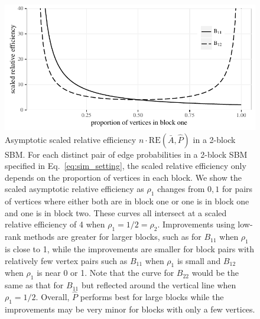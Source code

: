 \begin{figure}
\centering
\includegraphics[width=1\textwidth]{./Figures/rho.pdf}
\caption[Asymptotic scaled relative efficiency in a 2-block SBM]{Asymptotic scaled relative efficiency $n \cdot \mathrm{RE}(\bar{A},\hat{P})$ in a 2-block SBM.
For each distinct pair of edge probabilities in a 2-block SBM specified in Eq.~\ref{eq:sim_setting}, the scaled relative efficiency only depends on the proportion of vertices in each block.
We show the scaled asymptotic relative efficiency as $\rho_1$ changes from $0,1$ for pairs of vertices where either both are in block one or one is in block one and one is in block two. 
These curves all intersect at a scaled relative efficiency of 4 when $\rho_1=1/2=\rho_2$.
Improvements using low-rank methods are greater for larger blocks, such as for $B_{11}$ when $\rho_1$ is close to 1, while the improvements are smaller for block pairs with relatively few vertex pairs such as $B_{11}$ when $\rho_1$ is small and $B_{12}$ when $\rho_1$ is near 0 or 1.
Note that the curve for $B_{22}$ would be the same as that for $B_{11}$ but reflected around the vertical line when $\rho_1=1/2$.
Overall, $\hat{P}$ performs best for large blocks while the improvements may be very minor for blocks with only a few vertices.}
\label{fig:RErho}
\end{figure}

